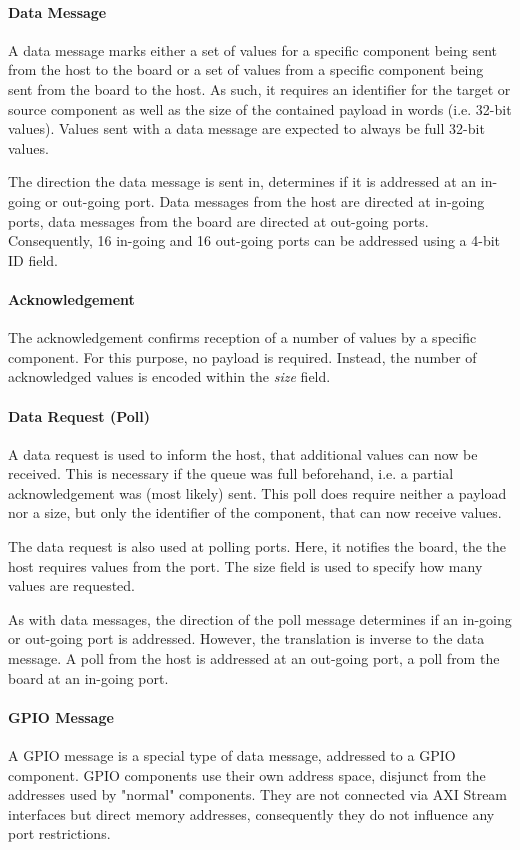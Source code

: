 \documentclass{report}
\begin{document}
\paragraph{Data Message}
A data message marks either a set of values for a specific component being sent from the host to the board or a set of values from a specific component being sent from the board to the host. As such, it requires an identifier for the target or source component as well as the size of the contained payload in words (i.e. 32-bit values). 
Values sent with a data message are expected to always be full 32-bit values.

The direction the data message is sent in, determines if it is addressed at an in-going or out-going port. Data messages from the host are directed at in-going ports, data messages from the board are directed at out-going ports. Consequently, 16 in-going and 16 out-going ports can be addressed using a 4-bit ID field.

\paragraph{Acknowledgement}
The acknowledgement confirms reception of a number of values by a specific component. For this purpose, no payload is required. Instead, the number of acknowledged values is encoded within the \textit{size} field.

\paragraph{Data Request (Poll)}
A data request is used to inform the host, that additional values can now be received. This is necessary if the queue was full beforehand, i.e. a partial acknowledgement was (most likely) sent. This poll does require neither a payload nor a size, but only the identifier of the component, that can now receive values.

The data request is also used at polling ports. Here, it notifies the board, the the host requires values from the port. The size field is used to specify how many values are requested.

As with data messages, the direction of the poll message determines if an in-going or out-going port is addressed. However, the translation is inverse to the data message. A poll from the host is addressed at an out-going port, a poll from the board at an in-going port.

\paragraph{GPIO Message}
A GPIO message is a special type of data message, addressed to a GPIO component. GPIO components use their own address space, disjunct from the addresses used by "normal" components. They are not connected via AXI Stream interfaces but direct memory addresses, consequently they do not influence any port restrictions.
\end{document}
